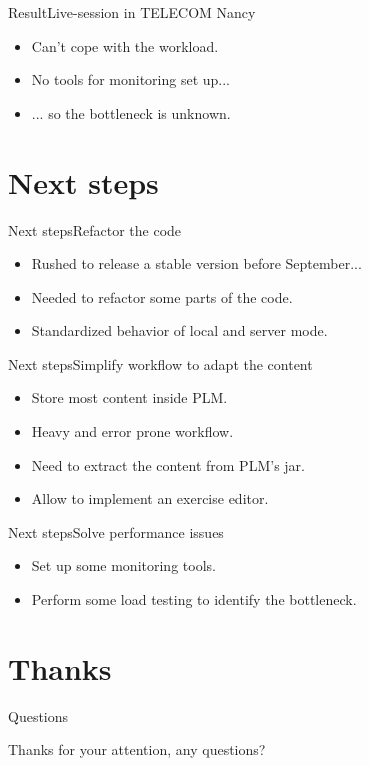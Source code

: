 \documentclass{beamer}
\begin{document}

\begin{frame}{Result}{Live-session in TELECOM Nancy}
  \begin{itemize}
  \item {
    Can't cope with the workload.
    \pause
  }
  \item {
    No tools for monitoring set up...
    \pause
  }
  \item {
    ... so the bottleneck is unknown.
  }
  \end{itemize}
\end{frame}


\section{Next steps}

\begin{frame}{Next steps}{Refactor the code}
  \begin{itemize}
  \item {
    Rushed to release a stable version before September...
  }
  \item {
    Needed to refactor some parts of the code.
  }
  \item {
    Standardized behavior of local and server mode.
  }
  \end{itemize}
\end{frame}

\begin{frame}{Next steps}{Simplify workflow to adapt the content}
  \begin{itemize}
  \item {
    Store most content inside PLM.
  }
  \item {
    Heavy and error prone workflow.
  }
  \item {
    Need to extract the content from PLM's jar.
  }
  \item {
    Allow to implement an exercise editor.
  }
  \end{itemize}
\end{frame}
  
\begin{frame}{Next steps}{Solve performance issues}
  \begin{itemize}
  \item {
    Set up some monitoring tools.
  }
  \item {
    Perform some load testing to identify the bottleneck.
  }
  \end{itemize}
\end{frame}

\section*{Thanks}

\begin{frame}{Questions}
  \begin{center}
    Thanks for your attention, any questions?
  \end{center}
\end{frame}
\end{document}
